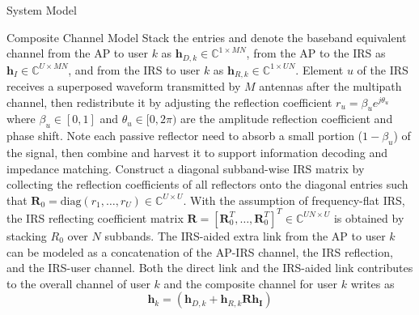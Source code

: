 \documentclass{IEEEtran}
\begin{document}
\begin{section} {System Model}
\begin{subsection} {Composite Channel Model}
            Stack the entries and denote the baseband equivalent channel from the AP to user $k$ as $\boldsymbol{h}_{D,k} \in \mathbb{C}^{1 \times MN}$, from the AP to the IRS as $\boldsymbol{h}_I \in \mathbb{C}^{U \times MN}$, and from the IRS to user $k$ as $\boldsymbol{h}_{R,k} \in \mathbb{C}^{1 \times UN}$. Element $u$ of the IRS receives a superposed waveform transmitted by $M$ antennas after the multipath channel, then redistribute it by adjusting the reflection coefficient $r_u = \beta_u e^{j \theta_u}$ where $\beta_u \in [0,1]$ and $\theta_u \in [0,2\pi)$ are the amplitude reflection coefficient and phase shift. Note each passive reflector need to absorb a small portion ($1 - \beta_u$) of the signal, then combine and harvest it to support information decoding and impedance matching. Construct a diagonal subband-wise IRS matrix by collecting the reflection coefficients of all reflectors onto the diagonal entries such that $\boldsymbol{R}_0 = \text{diag}(r_1, \dots, r_U) \in \mathbb{C}^{U \times U}$. With the assumption of frequency-flat IRS, the IRS reflecting coefficient matrix $\boldsymbol{R} = [\boldsymbol{R}_0^T,\dots,\boldsymbol{R}_0^T]^T \in \mathbb{C}^{UN \times U}$ is obtained by stacking $R_0$ over $N$ subbands. The IRS-aided extra link from the AP to user $k$ can be modeled as a concatenation of the AP-IRS channel, the IRS reflection, and the IRS-user channel. Both the direct link and the IRS-aided link contributes to the overall channel of user $k$ and the composite channel for user $k$ writes as
            \begin{equation} \label{eq:h_k}
                \boldsymbol{h}_k = \left( \boldsymbol{h}_{D,k}+\boldsymbol{h}_{R,k} \boldsymbol{R} \boldsymbol{\boldsymbol{h}_I} \right)
            \end{equation}
        \end{subsection}


\end{section}
\end{document}
